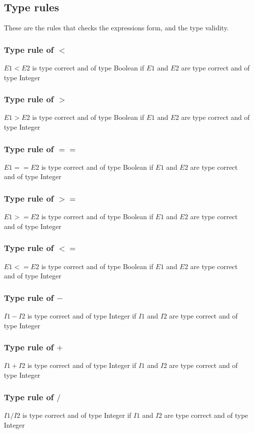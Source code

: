 	
\subsection{Type rules}
	These are the rules that checks the expressions form, and the type validity.
	
	\subsubsection*{Type rule of $<$}
		$E1 < E2$ is type correct and of type Boolean
		if $E1$ and $E2$ are type correct and of type Integer
	\subsubsection*{Type rule of $>$}
		$E1 > E2$ is type correct and of type Boolean
		if $E1$ and $E2$ are type correct and of type Integer
	\subsubsection*{Type rule of $==$}
		$E1 == E2$ is type correct and of type Boolean
		if $E1$ and $E2$ are type correct and of type Integer
	\subsubsection*{Type rule of $>=$}
		$E1 >= E2$ is type correct and of type Boolean
		if $E1$ and $E2$ are type correct and of type Integer
	\subsubsection*{Type rule of $<=$}
		$E1 <= E2$ is type correct and of type Boolean
		if $E1$ and $E2$ are type correct and of type Integer
	\subsubsection*{Type rule of $-$}
		$I1 - I2$ is type correct and of type Integer
		if $I1$ and $I2$ are type correct and of type Integer
	\subsubsection*{Type rule of $+$}
		$I1 + I2$ is type correct and of type Integer
		if $I1$ and $I2$ are type correct and of type Integer
	\subsubsection*{Type rule of $/$}
		$I1 / I2$ is type correct and of type Integer
		if $I1$ and $I2$ are type correct and of type Integer
